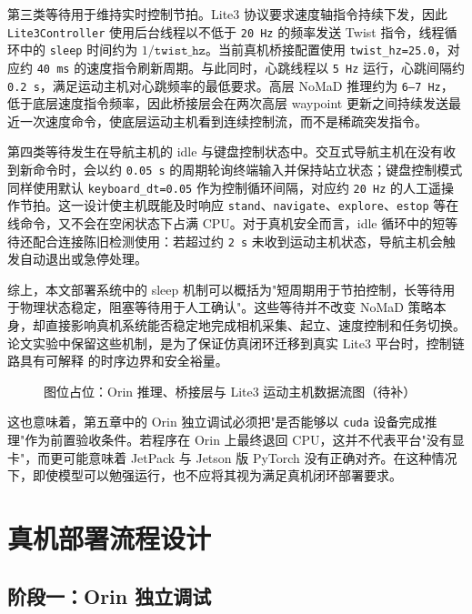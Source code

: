 第三类等待用于维持实时控制节拍。Lite3 协议要求速度轴指令持续下发，因此 \texttt{Lite3Controller} 使用后台线程以不低于
\texttt{20\,Hz} 的频率发送 Twist 指令，线程循环中的 \texttt{sleep} 时间约为 \(1/\texttt{twist\_hz}\)。当前真机桥接配置使用
\texttt{twist\_hz=25.0}，对应约 \texttt{40\,ms} 的速度指令刷新周期。与此同时，心跳线程以 \texttt{5\,Hz} 运行，心跳间隔约
\texttt{0.2\,s}，满足运动主机对心跳频率的最低要求。高层 NoMaD 推理约为 \texttt{6--7\,Hz}，低于底层速度指令频率，因此桥接层会在两次高层
waypoint 更新之间持续发送最近一次速度命令，使底层运动主机看到连续控制流，而不是稀疏突发指令。

第四类等待发生在导航主机的 idle 与键盘控制状态中。交互式导航主机在没有收到新命令时，会以约 \texttt{0.05\,s} 的周期轮询终端输入并保持站立状态；键盘控制模式
同样使用默认 \texttt{keyboard\_dt=0.05} 作为控制循环间隔，对应约 \texttt{20\,Hz} 的人工遥操作节拍。这一设计使主机既能及时响应
\texttt{stand}、\texttt{navigate}、\texttt{explore}、\texttt{estop} 等在线命令，又不会在空闲状态下占满 CPU。对于真机安全而言，idle
循环中的短等待还配合连接陈旧检测使用：若超过约 \texttt{2\,s} 未收到运动主机状态，导航主机会触发自动退出或急停处理。

综上，本文部署系统中的 sleep 机制可以概括为"短周期用于节拍控制，长等待用于物理状态稳定，阻塞等待用于人工确认"。这些等待并不改变 NoMaD
策略本身，却直接影响真机系统能否稳定地完成相机采集、起立、速度控制和任务切换。论文实验中保留这些机制，是为了保证仿真闭环迁移到真实 Lite3 平台时，控制链路具有可解释
的时序边界和安全裕量。

\begin{figure}[htbp]
    \centering
    \fbox{\rule{0pt}{55mm}\rule{0.86\linewidth}{0pt}}
    \caption{图位占位：Orin 推理、桥接层与 Lite3 运动主机数据流图（待补）}
    \label{fig:real-bridge-placeholder}
\end{figure}

这也意味着，第五章中的 Orin 独立调试必须把"是否能够以 \texttt{cuda} 设备完成推理"作为前置验收条件。若程序在 Orin 上最终退回
CPU，这并不代表平台"没有显卡"，而更可能意味着 JetPack 与 Jetson 版 PyTorch
没有正确对齐。在这种情况下，即使模型可以勉强运行，也不应将其视为满足真机闭环部署要求。

\section{真机部署流程设计}

\subsection{阶段一：Orin 独立调试}

